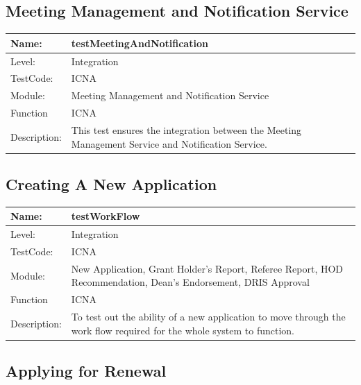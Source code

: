 \documentclass[12pt]{article}
\begin{document}
\subsection{Meeting Management and Notification Service}
\begin{center}
\begin{tabular}{|l|p{12cm}|}
\hline
 Name: & testMeetingAndNotification  \\
\hline
Level: & Integration \\
\hline
TestCode: & ICNA \\
\hline
Module:& Meeting Management and Notification Service \\
\hline
Function & ICNA \\
\hline
Description: & This test ensures the integration between the Meeting Management Service and Notification Service. \\
\hline
\end{tabular}
\end{center}

\subsection{Creating A New Application}
\begin{center}
\begin{tabular}{|l|p{12cm}|}
\hline
 Name: & testWorkFlow  \\
\hline
Level: & Integration \\
\hline
TestCode: & ICNA \\
\hline
Module:& New Application, Grant Holder's Report, Referee Report, HOD Recommendation, Dean's Endorsement, DRIS Approval \\
\hline
Function & ICNA \\
\hline
Description: & To test out the ability of a new application to move through the work flow required for the whole system to function. \\
\hline
\end{tabular}
\end{center}

\subsection{Applying for Renewal}
\end{document}
